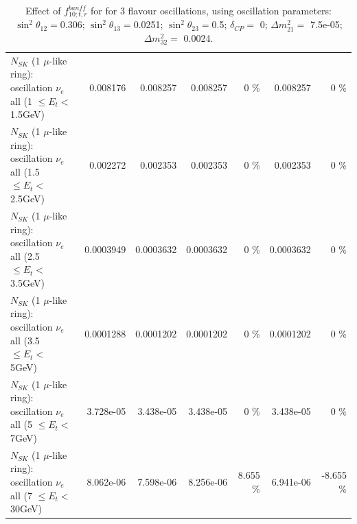 \begin{table}
\begin{tabular}{| l | r | r | r  r | r  r |}
$N_{SK}$ (1 $\mu$-like ring): oscillation $\nu_{e}$ all (1 $\leq E_{t} <$ 1.5GeV) &        0.008176 &        0.008257 &        0.008257 &        0 \%  &        0.008257 &        0 \%  \\ 
$N_{SK}$ (1 $\mu$-like ring): oscillation $\nu_{e}$ all (1.5 $\leq E_{t} <$ 2.5GeV) &        0.002272 &        0.002353 &        0.002353 &        0 \%  &        0.002353 &        0 \%  \\ 
$N_{SK}$ (1 $\mu$-like ring): oscillation $\nu_{e}$ all (2.5 $\leq E_{t} <$ 3.5GeV) &       0.0003949 &       0.0003632 &       0.0003632 &        0 \%  &       0.0003632 &        0 \%  \\ 
$N_{SK}$ (1 $\mu$-like ring): oscillation $\nu_{e}$ all (3.5 $\leq E_{t} <$ 5GeV) &       0.0001288 &       0.0001202 &       0.0001202 &        0 \%  &       0.0001202 &        0 \%  \\ 
 $N_{SK}$ (1 $\mu$-like ring): oscillation $\nu_{e}$ all (5 $\leq E_{t} <$ 7GeV) &       3.728e-05 &       3.438e-05 &       3.438e-05 &        0 \%  &       3.438e-05 &        0 \%  \\ 
$N_{SK}$ (1 $\mu$-like ring): oscillation $\nu_{e}$ all (7 $\leq E_{t} <$ 30GeV) &       8.062e-06 &       7.598e-06 &       8.256e-06 &    8.655 \%  &       6.941e-06 &   -8.655 \%  \\ 
\hline
\hline
\end{tabular}
\caption{ Effect of $f_{10; t, r}^{banff}$ for for 3 flavour oscillations, using oscillation parameters:  $\sin^2\theta_{12} = $0.306; $\sin^2\theta_{13} = $0.0251; $\sin^2\theta_{23} = $0.5; $\delta_{CP} = $        0; $\Delta m^2_{21} = $    7.5e-05; $\Delta m^2_{32} = $    0.0024. }
\label{tab:num_banff_10_1RmuT_3f_osc_t13:0.0251}
\end{table}
\clearpage
